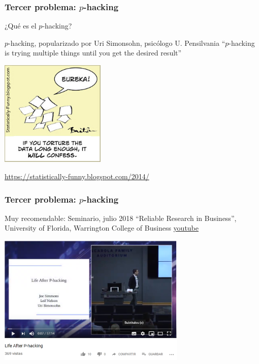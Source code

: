\documentclass[9pt]{beamer}
\begin{document}
\begin{frame}
  \frametitle{Tercer problema: $p$-hacking}
  ¿Qué es el $p$-hacking?
  \begin{block}{$p$-hacking, popularizado por Uri Simonsohn, psicólogo
      U. Pensilvania}
    ``$p$-hacking is trying multiple things until you get the desired result''
  \end{block}
  \begin{center}
    \includegraphics[width=5cm]{images/torture}
  \end{center}
  \hfill
    {\scriptsize \href{https://statistically-funny.blogspot.com/2014/}{https://statistically-funny.blogspot.com/2014/}}
\end{frame}
\begin{frame}
  \frametitle{Tercer problema: $p$-hacking}
  Muy recomendable: Seminario, julio 2018 ``Reliable Research in
  Business'', University of Florida, Warrington College of Business \href{https://youtu.be/8wDwcp1EwNM}{youtube}
  \begin{center}
    \includegraphics[width=9cm]{images/p-hacking}
  \end{center}
\end{frame}
\end{document}
